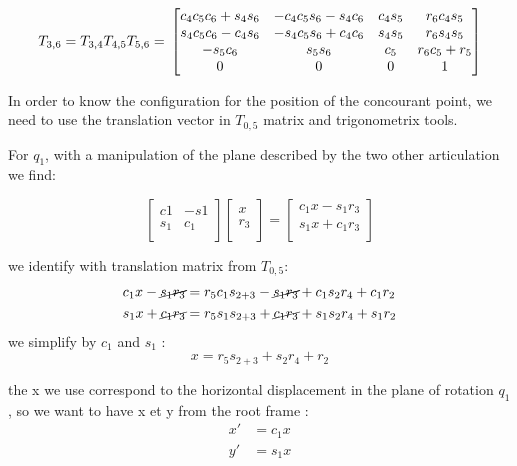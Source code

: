 \documentclass{article}
\begin{document}
\[
T_{3,6} = T_{3,4} T_{4,5} T_{5,6}= \\
\begin{bmatrix}
  c_4c_5c_6+s_4s_6 & -c_4c_5s_6-s_4c_6 & c_4s_5 & r_6c_4s_5 \\
  s_4c_5c_6-c_4s_6 & -s_4c_5s_6+c_4c_6 & s_4s_5 & r_6s_4s_5 \\
  -s_5c_6 & s_5s_6 & c_5 & r_6c_5 + r_5 \\
  0 & 0 & 0 & 1 \\
\end{bmatrix}
\]

In order to know the configuration for the position of the concourant point, we need to use the translation vector in $T_{0,5}$ matrix and trigonometrix tools.

For $q_1$, with a manipulation of the plane described by the two other articulation we find:

\begin{equation}
  \begin{bmatrix}
    c1 & -s1\\
    s_1 & c_1\\
  \end{bmatrix}
  \begin{bmatrix}
    x\\
    r_3\\
  \end{bmatrix}
  =
  \begin{bmatrix}
    c_1x-s_1r_3\\
    s_1x+c_1r_3\\
  \end{bmatrix}
\end{equation}

we identify with translation matrix from $T_{0,5}$:
\begin{align*}
  c_1x-\cancel{s_1r_3}&=r_5c_1s_{2+3}-\cancel{s_1r_3} +c_1s_2r_4+ c_1r_2\\
  s_1x+\cancel{c_1r_3}&=r_5s_1s_{2+3}+\cancel{c_1r_3}+s_1s_2r_4+s_1r_2\\
\end{align*}
we simplify by $c_1$ and $s_1$ :
\begin{equation}
  x=r_5s_{2+3}+s_2r_4+r_2
\end{equation}

the x we use correspond to the horizontal displacement in the plane of rotation $q_1$, so we want to have x et y from the root frame :
\begin{align*}
  x'&=c_1x\\
  y'&=s_1x\\
\end{align*}
\end{document}
